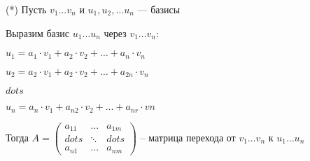 \begin{definition}
    (*)
    Пусть $v_1 \ldots v_n$ и $u_1, u_2, \ldots u_n$ --- базисы

    Выразим базис $u_1 \ldots u_n$ через $v_1 \ldots v_n$:

    $u_1 = a_1 \cdot v_1 + a_2 \cdot v_2 + \ldots + a_n \cdot v_n$
    
    $u_2 = a_2 \cdot v_1 + a_2 \cdot v_2 + \ldots + a_{2n} \cdot v_n$

    $dots$

    $u_n = a_n \cdot v_1 + a_{n2} \cdot v_2 + \ldots + a_{nr} \cdot vn$

    Тогда $A = \left(
        \begin{array}{ccc}
            a_{11} & \ldots & a_{1m}\\
            dots & \ddots & dots\\
            a_{n1} &\ldots & a_{nm}
        \end{array}
        \right)$ -- матрица перехода от $v_1 \ldots v_n$ к $u_1 \ldots u_n$
        

\end{definition}


